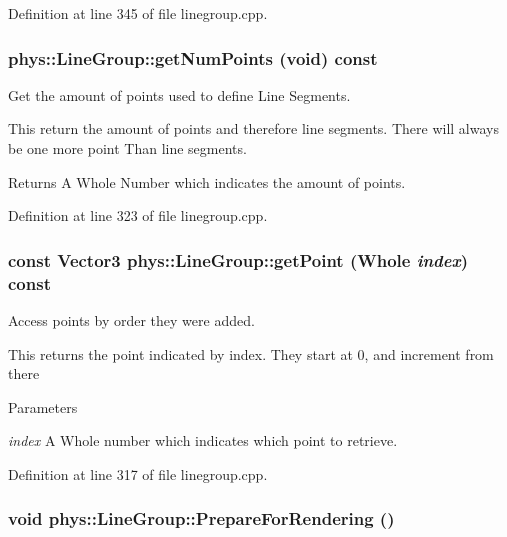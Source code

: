 Definition at line 345 of file linegroup.cpp.

\hypertarget{classphys_1_1LineGroup_a32e14111a18318fd17aa503b1d3cfe8c}{
\subsubsection[{getNumPoints}]{ phys::LineGroup::getNumPoints (void) const}}
\label{db/ddb/classphys_1_1LineGroup_a32e14111a18318fd17aa503b1d3cfe8c}


Get the amount of points used to define Line Segments. 

This return the amount of points and therefore line segments. There will always be one more point Than line segments. \begin{DoxyReturn}{Returns}
A Whole Number which indicates the amount of points. 
\end{DoxyReturn}


Definition at line 323 of file linegroup.cpp.

\hypertarget{classphys_1_1LineGroup_a960e1ceba7e9804b7906f8618f869202}{
\subsubsection[{getPoint}]{\setlength{\rightskip}{0pt plus 5cm}const {\bf Vector3} phys::LineGroup::getPoint ({\bf Whole} {\em index}) const}}
\label{db/ddb/classphys_1_1LineGroup_a960e1ceba7e9804b7906f8618f869202}


Access points by order they were added. 

This returns the point indicated by index. They start at 0, and increment from there 
\begin{DoxyParams}{Parameters}
\item[{\em index}]A Whole number which indicates which point to retrieve. \end{DoxyParams}


Definition at line 317 of file linegroup.cpp.

\hypertarget{classphys_1_1LineGroup_ab8d5c3c91dd16008429cc4cafed7f42f}{
\subsubsection[{PrepareForRendering}]{\setlength{\rightskip}{0pt plus 5cm}void phys::LineGroup::PrepareForRendering ()}}
\label{db/ddb/classphys_1_1LineGroup_ab8d5c3c91dd16008429cc4cafed7f42f}


